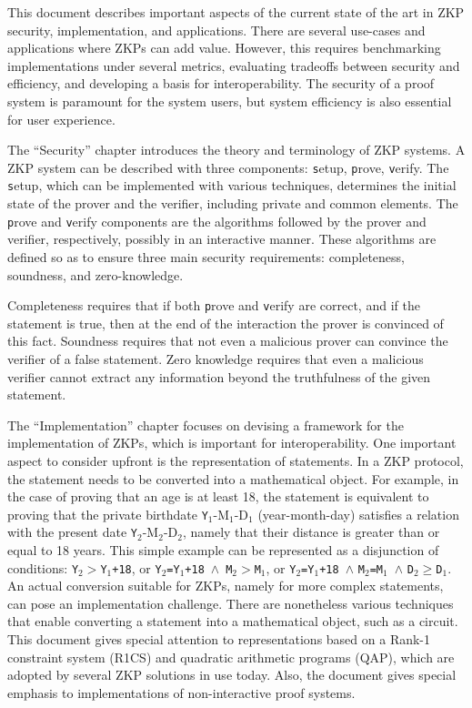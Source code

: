 	This document describes important aspects of the current state of the art in ZKP security, implementation, and applications.
	There are several use-cases and applications where ZKPs can add value.
	However, this requires benchmarking implementations under several metrics, evaluating tradeoffs between security and efficiency, and developing a basis for interoperability.
    The security of a proof system is paramount for the system users, but system efficiency is also essential for user experience.
\loosen


	The ``Security'' chapter introduces the theory and terminology of ZKP systems.
	A ZKP system can be described with three components: {\texttt setup}, {\texttt prove}, {\texttt verify}. 
	The {\texttt setup}, which can be implemented with various techniques, determines the initial state of the prover and the verifier, including private and common elements.
	The {\texttt prove} and {\texttt verify} components are the algorithms followed by the prover and verifier, respectively, possibly in an interactive manner.
	These algorithms are defined so as to ensure three main security requirements: completeness, soundness, and zero-knowledge.

	Completeness requires that if both {\texttt prove} and {\texttt verify} are correct, and if the statement is true, then at the end of the interaction the prover is convinced of this fact.
	Soundness requires that not even a malicious prover can convince the verifier of a false statement.
	Zero knowledge requires that even a malicious verifier cannot extract any information beyond the truthfulness of the given statement.  


	The ``Implementation'' chapter focuses on devising a framework for the implementation of ZKPs, which is important for interoperability.
	One important aspect to consider upfront is the representation of statements.
	In a ZKP protocol, the statement needs to be converted into a mathematical object.
	For example, in the case of proving that an age is at least 18, the statement is equivalent to proving that the private birthdate {\texttt Y$_1$-M$_1$-D$_1$} (year-month-day) satisfies a relation with the present date {\texttt Y$_2$-M$_2$-D$_2$}, namely that their distance is greater than or equal to 18 years.
	This simple example can be represented as a disjunction of conditions: 
{\tt Y$_2>$Y$_1$+18}, 
or {\tt Y$_2$=Y$_1$+18}~$\wedge$~{\tt M$_2$}$>${\tt M$_1$},
or {\tt Y$_2$=Y$_1$+18 }$\wedge${ \tt M$_2$=M$_1$ }$\wedge${ \tt D$_2$}$\geq${\tt D$_1$}.
	An actual conversion suitable for ZKPs, namely for more complex statements, can pose an implementation challenge. 
    There are nonetheless various techniques that enable converting a statement into a mathematical object, such as a circuit.
    This document gives special attention to representations based on a Rank-1 constraint system (R1CS) and quadratic arithmetic programs (QAP), which are adopted by several ZKP solutions in use today.
	Also, the document gives special emphasis to implementations of non-interactive proof systems.
\loosen


